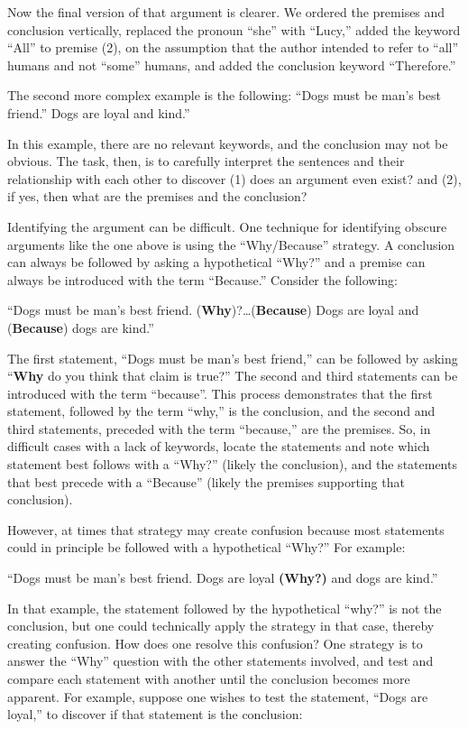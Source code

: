 \documentclass[
]{book}
\begin{document}
Now the final version of that argument is clearer. We ordered the premises and conclusion vertically, replaced the pronoun ``she'' with ``Lucy,'' added the keyword ``All'' to premise (2), on the assumption that the author intended to refer to ``all'' humans and not ``some'' humans, and added the conclusion keyword ``Therefore.''

The second more complex example is the following:
``Dogs must be man's best friend.'' Dogs are loyal and kind.''

In this example, there are no relevant keywords, and the conclusion may not be obvious. The task, then, is to carefully interpret the sentences and their relationship with each other to discover (1) does an argument even exist? and (2), if yes, then what are the premises and the conclusion?

Identifying the argument can be difficult. One technique for identifying obscure arguments like the one above is using the ``Why/Because'' strategy. A conclusion can always be followed by asking a hypothetical ``Why?'' and a premise can always be introduced with the term ``Because.'' Consider the following:

``Dogs must be man's best friend. (\textbf{Why})?\ldots(\textbf{Because}) Dogs are loyal and (\textbf{Because}) dogs are kind.''

The first statement, ``Dogs must be man's best friend,'' can be followed by asking ``\textbf{Why} do you think that claim is true?'' The second and third statements can be introduced with the term ``because''. This process demonstrates that the first statement, followed by the term ``why,'' is the conclusion, and the second and third statements, preceded with the term ``because,'' are the premises. So, in difficult cases with a lack of keywords, locate the statements and note which statement best follows with a ``Why?'' (likely the conclusion), and the statements that best precede with a ``Because'' (likely the premises supporting that conclusion).

However, at times that strategy may create confusion because most statements could in principle be followed with a hypothetical ``Why?'' For example:

``Dogs must be man's best friend. Dogs are loyal \textbf{(Why?)} and dogs are kind.''

In that example, the statement followed by the hypothetical ``why?'' is not the conclusion, but one could technically apply the strategy in that case, thereby creating confusion. How does one resolve this confusion? One strategy is to answer the ``Why'' question with the other statements involved, and test and compare each statement with another until the conclusion becomes more apparent. For example, suppose one wishes to test the statement, ``Dogs are loyal,'' to discover if that statement is the conclusion:
\end{document}
